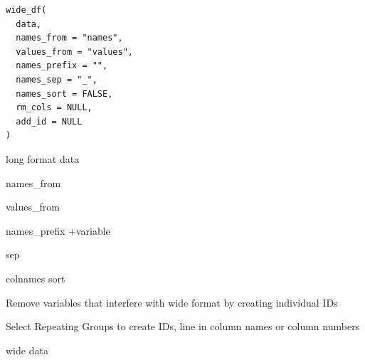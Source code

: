 \documentclass[a4paper]{book}
\begin{document}
%
\begin{Usage}
\begin{verbatim}
wide_df(
  data,
  names_from = "names",
  values_from = "values",
  names_prefix = "",
  names_sep = "_",
  names_sort = FALSE,
  rm_cols = NULL,
  add_id = NULL
)
\end{verbatim}
\end{Usage}
%
\begin{Arguments}
\begin{ldescription}
\item[\code{data}] long format data

\item[\code{names\_from}] names\_from

\item[\code{values\_from}] values\_from

\item[\code{names\_prefix}] names\_prefix +variable

\item[\code{names\_sep}] sep

\item[\code{names\_sort}] colnames sort

\item[\code{rm\_cols}] Remove variables that interfere with wide format by creating individual IDs

\item[\code{add\_id}] Select Repeating Groups to create IDs, line in column names or column numbers
\end{ldescription}
\end{Arguments}
%
\begin{Value}
wide data
\end{Value}
%
\end{document}
